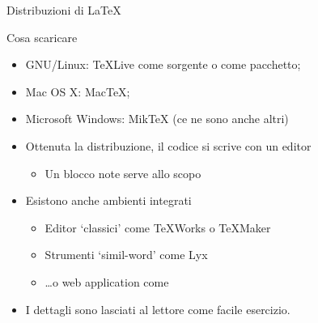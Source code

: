 \documentclass{beamer}
\begin{document}
\begin{frame}{Distribuzioni di \LaTeX{}}

\begin{block}{Cosa scaricare}

\begin{itemize}
\item GNU/Linux: \TeX{}Live come sorgente o come pacchetto;
\item Mac OS X: Mac\TeX{};
\item Microsoft Windows: Mik\TeX{} (ce ne sono anche altri)
\end{itemize}
\end{block}

\begin{itemize}
\item Ottenuta la distribuzione, il codice si scrive con un editor
	\begin{itemize}
	\item Un  blocco note serve allo scopo
	\end{itemize}
\item Esistono anche ambienti integrati
	\begin{itemize}
	\item Editor `classici' come \TeX{}Works o \TeX{}Maker
	\item Strumenti `simil-word' come Lyx
	\item \ldots o web application come \wllogo
	\end{itemize}
\item I dettagli sono lasciati al lettore come \alert{facile} esercizio.
\end{itemize}

\end{frame}

\end{document}
